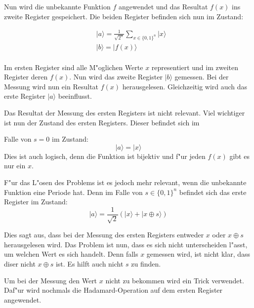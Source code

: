 \begin{refsection}
Nun wird die unbekannte Funktion $f$ angewendet und das Resultat $f(x)$ ins
zweite Register gespeichert. Die beiden Register befinden sich nun im Zustand:

\begin{align*}
  & |a\rangle = \frac{1}{\sqrt{2^n}} \sum_{x\in\{0,1\}^n} {|x\rangle} \\
  & |b\rangle = |f(x)\rangle \\
\end{align*}

Im ersten Register sind alle M"oglichen Werte $x$ representiert und im zweiten
Register deren $f(x)$. Nun wird das zweite Register $|b\rangle$ gemessen. Bei
der Messung wird nun ein Resultat $f(x)$ herausgelesen. Gleichzeitig wird auch
das erste Register $|a\rangle$ beeinflusst.

Das Resultat der Messung des ersten Registers ist nicht relevant. Viel
wichtiger ist nun der Zustand des ersten Registers. Dieser befindet sich im

Falle von $s = 0$ im Zustand:
\[
    |a\rangle = |x\rangle
\]
Dies ist auch logisch, denn die Funktion ist bijektiv und f"ur jeden $f(x)$
gibt es nur ein $x$. %

F"ur das L"osen des Problems ist es jedoch mehr relevant, wenn die unbekannte
Funktion eine Periode hat. Denn im Falle von $s \in \{0,1\}^n$ befindet sich
das erste Register im Zustand:
\[
    |a\rangle = \frac{1}{\sqrt{2}} ( |x\rangle + |x \oplus s \rangle )
\]

Dies sagt aus, dass bei der Messung des ersten Registers entweder $x$ oder $x
\oplus s$ herausgelesen wird. Das Problem ist nun, dass es sich nicht
unterscheiden l"asst, um welchen Wert es sich handelt. Denn falls $x$ gemessen
wird, ist nicht klar, dass diser nicht $x \oplus s$ ist. Es hilft auch nicht
$s$ zu finden.

Um bei der Messung den Wert $x$ nicht zu bekommen wird ein Trick verwendet.
Daf"ur wird nochmals die Hadamard-Operation auf dem ersten Register angewendet.


\end{refsection}
